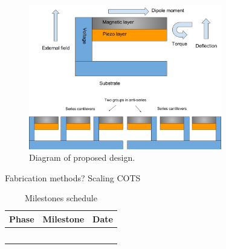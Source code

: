 \begin{figure}
\centering
\includegraphics[width=0.75\textwidth]{biomag}
\caption{Diagram of proposed design.}
\label{fig:diagram}
\end{figure}

Fabrication methods?
Scaling
COTS
\begin{table}[h!]
\centering
  \begin{tabular}{|c||c|c|}
    \hline
    Phase & Milestone & Date\\
    \hline
    \hline
    & & \\
    \hline
    & & \\
    \hline
    & & \\
    \hline
    & & \\
    \hline
    & & \\
    \hline
  \end{tabular}
\caption{Milestones schedule}
\label{table:sched}
\end{table}

    

